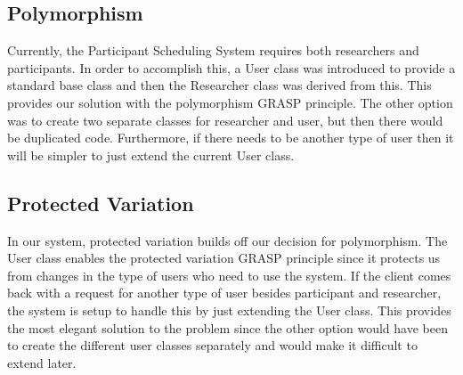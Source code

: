 \subsection{Polymorphism}
Currently, the Participant Scheduling System requires both researchers and participants. In order to accomplish this, a User class was introduced to provide a standard base class and then the Researcher class was derived from this. This provides our solution with the polymorphism GRASP principle. The other option was to create two separate classes for researcher and user, but then there would be duplicated code. Furthermore, if there needs to be another type of user then it will be simpler to just extend the current User class.

\subsection{Protected Variation}
In our system, protected variation builds off our decision for polymorphism. The User class enables the protected variation GRASP principle since it protects us from changes in the type of users who need to use the system. If the client comes back with a request for another type of user besides participant and researcher, the system is setup to handle this by just extending the User class. This provides the most elegant solution to the problem since the other option would have been to create the different user classes separately and would make it difficult to extend later.